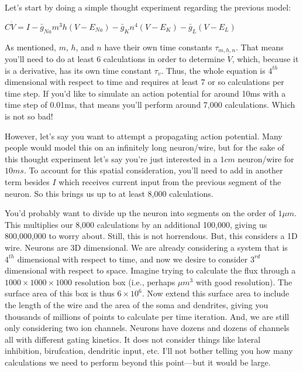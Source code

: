 \documentclass[12pt]{amsart}
\begin{document}
Let's start by doing a simple thought experiment regarding the previous model: 

\bigskip

\begin{center}

    $C\dot{V} = I - \bar{g}_{Na}m^3h(V - E_{Na}) - \bar{g}_{K}n^4(V - E_{K}) - \bar{g}_{L}(V - E_{L})$
    
\end{center}

\bigskip

As mentioned, $m$, $h$, and $n$ have their own time constants $\tau_{m,h,n}$. That means you'll need to do at least 6 calculations in order to determine $\dot{V}$, which, because it is a derivative, has its own time constant $\tau_v$. Thus, the whole equation is $4^{th}$ dimensional with respect to time and requires at least 7 or so calculations per time step. If you'd like to simulate an action potential for around 10ms with a time step of 0.01ms, that means you'll perform around 7,000 calculations. Which is not so bad!\newline 

However, let's say you want to attempt a propagating action potential. Many people would model this on an infinitely long neuron/wire, but for the sake of this thought experiment let's say you're just interested in a $1cm$ neuron/wire for $10ms$. To account for this spatial consideration, you'll need to add in another term besides $I$ which receives  current input from the previous segment of the neuron. So this brings us up to at least 8,000 calculations.\newline

You'd probably want to divide up the neuron into segments on the order of $1\mu m$. This multiplies our 8,000 calculations by an additional 100,000, giving us 800,000,000 to worry about. Still, this is not horrendous. But, this considers a 1D wire. Neurons are 3D dimensional. We are already considering a system that is $4^{th}$ dimensional with respect to time, and now we desire to consider $3^{rd}$ dimensional with respect to space. Imagine trying to calculate the flux through a $1000 \times 1000 \times 1000$ resolution box (i.e., perhaps $\mu m^3$ with good resolution). The surface area of this box is thus $6\times 10^6$. Now extend this surface area to include the length of the wire and the area of the soma and dendrites, giving you thousands of millions of points to calculate per time iteration. And, we are still only considering two ion channels. Neurons have dozens and dozens of channels all with different gating kinetics. It does not consider things like lateral inhibition, birufcation, dendritic input, etc. I'll not bother telling you how many calculations we need to perform beyond this point---but it would be large. 
\end{document}
